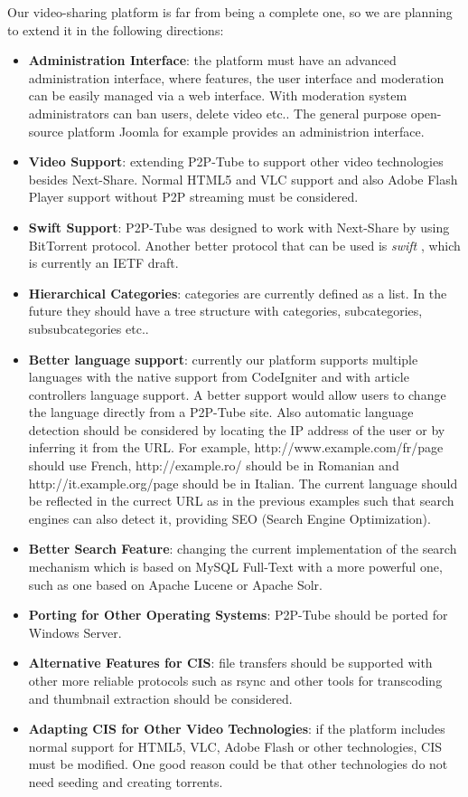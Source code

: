 Our video-sharing platform is far from being a complete one, so we are planning to extend it in the following directions:

\begin{itemize}
 \item \textbf{Administration Interface}: the platform must have an advanced administration interface, where features, the user interface and moderation can be easily managed via a web interface. With moderation system administrators can ban users, delete video etc.. The general purpose open-source platform Joomla for example provides an administrion interface.
 \item \textbf{Video Support}: extending P2P-Tube to support other video technologies besides Next-Share. Normal HTML5 and VLC support and also Adobe Flash Player support without P2P streaming must be considered.
 \item \textbf{Swift Support}: P2P-Tube was designed to work with Next-Share by using BitTorrent protocol. Another better protocol that can be used is \textit{swift} \cite{swift}, which is currently an IETF draft.
 \item \textbf{Hierarchical Categories}: categories are currently defined as a list. In the future they should have a tree structure with categories, subcategories, subsubcategories etc..
 \item \textbf{Better language support}: currently our platform supports multiple languages with the native support from CodeIgniter and with article controllers language support. A better support would allow users to change the language directly from a P2P-Tube site. Also automatic language detection should be considered by locating the IP address of the user or by inferring it from the URL. For example, http://www.example.com/fr/page should use French, http://example.ro/ should be in Romanian and http://it.example.org/page should be in Italian. The current language should be reflected in the currect URL as in the previous examples such that search engines can also detect it, providing SEO (Search Engine Optimization).
 \item \textbf{Better Search Feature}: changing the current implementation of the search mechanism which is based on MySQL Full-Text with a more powerful one, such as one based on Apache Lucene or Apache Solr.
 \item \textbf{Porting for Other Operating Systems}: P2P-Tube should be ported for Windows Server.
 \item \textbf{Alternative Features for CIS}: file transfers should be supported with other more reliable protocols such as rsync and other tools for transcoding and thumbnail extraction should be considered.
 \item \textbf{Adapting CIS for Other Video Technologies}: if the platform includes normal support for HTML5, VLC, Adobe Flash or other technologies, CIS must be modified. One good reason could be that other technologies do not need seeding and creating torrents.
\end{itemize}

